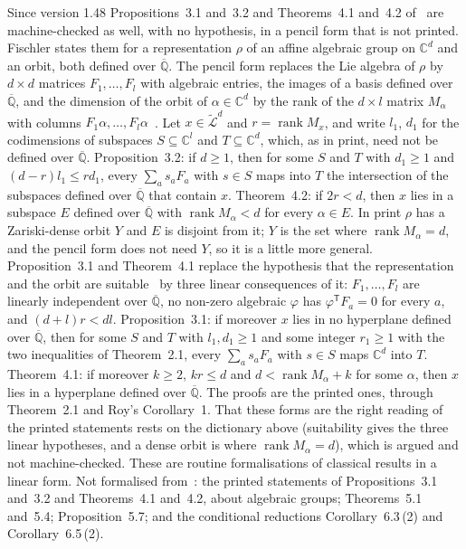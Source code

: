 \documentclass[11pt,a4paper]{article}
\theoremstyle{plain}
\theoremstyle{definition}
\newcommand{\C}{\mathbb{C}}
\newcommand{\Alg}{\overline{\mathbb{Q}}}
\newcommand{\aLogs}{\widetilde{\mathcal{L}}}
\begin{document}
Since version 1.48 Propositions~3.1 and~3.2 and Theorems~4.1 and~4.2 of~\cite{fischler-2001} are machine-checked as
well, with no hypothesis, in a pencil form that is not printed. Fischler states them for a representation $\rho$ of an
affine algebraic group on $\C^{d}$ and an orbit, both defined over $\Alg$. The pencil form replaces the Lie algebra of
$\rho$ by $d\times d$ matrices $F_{1},\dots,F_{l}$ with algebraic entries, the images of a basis defined over $\Alg$,
and the dimension of the orbit of $\alpha\in\C^{d}$ by the rank of the $d\times l$ matrix $M_{\alpha}$ with columns
$F_{1}\alpha,\dots,F_{l}\alpha$~\cite[Lemma~2.4]{fischler-2001}. Let $x\in\aLogs^{d}$ and $r=\operatorname{rank}M_{x}$,
and write $l_{1}$, $d_{1}$ for the codimensions of subspaces $S\subseteq\C^{l}$ and $T\subseteq\C^{d}$, which, as in
print, need not be defined over $\Alg$. Proposition~3.2: if $d\geq1$, then for some $S$ and $T$ with $d_{1}\geq1$ and
$(d-r)l_{1}\leq rd_{1}$, every $\sum_{a}s_{a}F_{a}$ with $s\in S$ maps into $T$ the intersection of the subspaces
defined over $\Alg$ that contain $x$. Theorem~4.2: if $2r<d$, then $x$ lies in a subspace $E$ defined over $\Alg$ with
$\operatorname{rank}M_{\alpha}<d$ for every $\alpha\in E$. In print $\rho$ has a Zariski-dense orbit $Y$ and $E$ is
disjoint from it; $Y$ is the set where $\operatorname{rank}M_{\alpha}=d$, and the pencil form does not need $Y$, so it
is a little more general. Proposition~3.1 and Theorem~4.1 replace the hypothesis that the representation and the orbit
are suitable~\cite[p.~172]{fischler-2001} by three linear consequences of it: $F_{1},\dots,F_{l}$ are linearly
independent over $\Alg$, no non-zero algebraic $\varphi$ has $\varphi^{\mathsf{T}}F_{a}=0$ for every $a$, and
$(d+l)r<dl$. Proposition~3.1: if moreover $x$ lies in no hyperplane defined over $\Alg$, then for some $S$ and $T$
with $l_{1},d_{1}\geq1$ and some integer $r_{1}\geq1$ with the two inequalities of Theorem~2.1, every
$\sum_{a}s_{a}F_{a}$ with $s\in S$ maps $\C^{d}$ into $T$. Theorem~4.1: if moreover $k\geq2$, $kr\leq d$ and
$d<\operatorname{rank}M_{\alpha}+k$ for some $\alpha$, then $x$ lies in a hyperplane defined over $\Alg$. The proofs
are the printed ones, through Theorem~2.1 and Roy's Corollary~1. That these forms are the right reading of the printed
statements rests on the dictionary above (suitability gives the three linear hypotheses, and a dense orbit is where
$\operatorname{rank}M_{\alpha}=d$), which is argued and not machine-checked. These are routine formalisations of
classical results in a linear form. Not formalised from~\cite{fischler-2001}: the printed statements of
Propositions~3.1 and~3.2 and Theorems~4.1 and~4.2, about algebraic groups; Theorems~5.1 and~5.4; Proposition~5.7; and
the conditional reductions Corollary~6.3\,(2) and Corollary~6.5\,(2).
\end{document}
